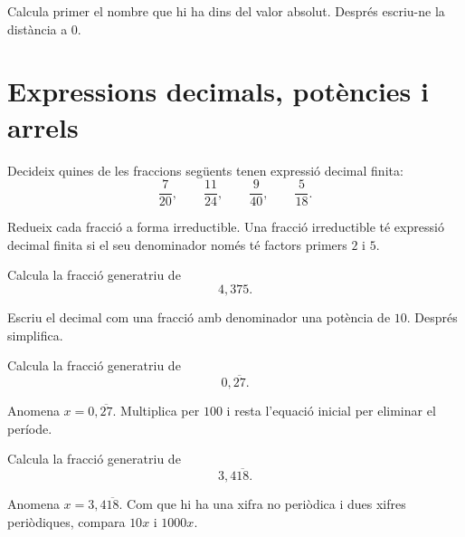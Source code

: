\begin{indicacio}
	Calcula primer el nombre que hi ha dins del valor absolut. Després escriu-ne la distància a \(0\).
\end{indicacio}

\section{Expressions decimals, potències i arrels}

\begin{exercici}
	Decideix quines de les fraccions següents tenen expressió decimal finita:
	\[
	\frac{7}{20},
	\qquad
	\frac{11}{24},
	\qquad
	\frac{9}{40},
	\qquad
	\frac{5}{18}.
	\]
\end{exercici}

\begin{indicacio}
	Redueix cada fracció a forma irreductible. Una fracció irreductible té expressió decimal finita si el seu denominador només té factors primers \(2\) i \(5\).
\end{indicacio}

\begin{exercici}
	Calcula la fracció generatriu de
	\[
	4{,}375.
	\]
\end{exercici}

\begin{indicacio}
	Escriu el decimal com una fracció amb denominador una potència de \(10\). Després simplifica.
\end{indicacio}

\begin{exercici}
	Calcula la fracció generatriu de
	\[
	0{,}\overline{27}.
	\]
\end{exercici}

\begin{indicacio}
	Anomena \(x=0{,}\overline{27}\). Multiplica per \(100\) i resta l'equació inicial per eliminar el període.
\end{indicacio}

\begin{exercici}
	Calcula la fracció generatriu de
	\[
	3{,}4\overline{18}.
	\]
\end{exercici}

\begin{indicacio}
	Anomena \(x=3{,}4\overline{18}\). Com que hi ha una xifra no periòdica i dues xifres periòdiques, compara \(10x\) i \(1000x\).
\end{indicacio}

